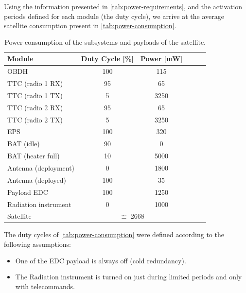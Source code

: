 Using the information presented in \autoref{tab:power-requirements}, and the activation periods defined for each module (the duty cycle), we arrive at the average satellite consumption present in \autoref{tab:power-consumption}.

\begin{table}[!h]
    \centering
    \begin{tabular}{lccccc}
        \toprule[1.5pt]
        \textbf{Module} & \textbf{Duty Cycle [\%]}    & \textbf{Power [mW]} \\
        \midrule
        OBDH                    & 100   & 115 \\
        TTC (radio 1 RX)        & 95    & 65 \\
        TTC (radio 1 TX)        & 5     & 3250 \\
        TTC (radio 2 RX)        & 95    & 65 \\
        TTC (radio 2 TX)        & 5     & 3250 \\
        EPS                     & 100   & 320 \\
        BAT (idle)              & 90    & 0 \\
        BAT (heater full)       & 10    & 5000 \\
        Antenna (deployment)    & 0     & 1800 \\
        Antenna (deployed)      & 100   & 35 \\
        Payload EDC             & 100   & 1250 \\
        Radiation instrument        & 0     & 1000 \\
        \cmidrule{2-3}
        Satellite               & \multicolumn{2}{c}{$\cong$ 2668} \\
        \bottomrule[1.5pt]
    \end{tabular}
    \caption{Power consumption of the subsystems and payloads of the satellite.}
    \label{tab:power-consumption}
\end{table}

The duty cycles of \autoref{tab:power-consumption} were defined according to the following assumptions:

\begin{itemize}
    \item One of the EDC payload is always off (cold redundancy).
    \item The Radiation instrument is turned on just during limited periods and only with telecommands.
\end{itemize}

